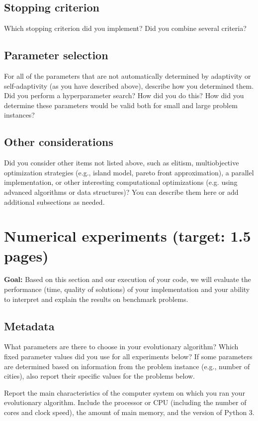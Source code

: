 \documentclass[a4paper,10pt]{article}
\newcommand{\ReplaceMe}[1]{{\color{blue}#1}}
\newcommand{\RemoveMe}[1]{{\color{purple}#1}}
\begin{document}
\subsection{Stopping criterion}

\ReplaceMe{Which stopping criterion did you implement? Did you combine several criteria?}

\subsection{Parameter selection}

\ReplaceMe{For all of the parameters that are not automatically determined by adaptivity or self-adaptivity (as you have described above), describe how you determined them. Did you perform a hyperparameter search? How did you do this? How did you determine these parameters would be valid both for small and large problem instances?}

\subsection{Other considerations}

\ReplaceMe{Did you consider other items not listed above, such as elitism, multiobjective optimization strategies (e.g., island model, pareto front approximation), a parallel implementation, or other interesting computational optimizations (e.g. using advanced algorithms or data structures)? You can describe them here or add additional subsections as needed.}


\section{Numerical experiments (target: 1.5 pages)}

\RemoveMe{\textbf{Goal:} Based on this section and our execution of your code, we will evaluate the performance (time, quality of solutions) of your implementation and your ability to interpret and explain the results on benchmark problems.}

\subsection{Metadata}

\ReplaceMe{What parameters are there to choose in your evolutionary algorithm? Which fixed parameter values did you use for all experiments below? If some parameters are determined based on information from the problem instance (e.g., number of cities), also report their specific values for the problems below.

Report the main characteristics of the computer system on which you ran your evolutionary algorithm. Include the processor or CPU (including the number of cores and clock speed), the amount of main memory, and the version of Python 3.}
\end{document}
